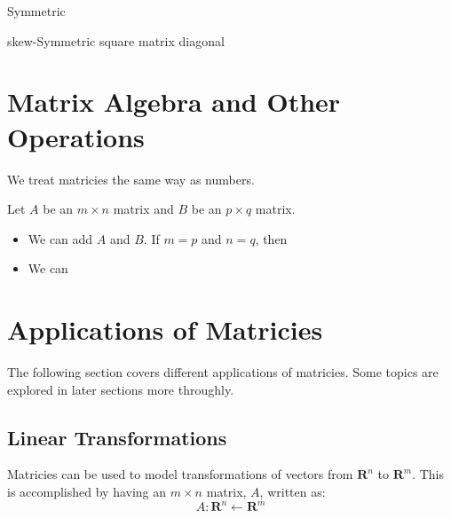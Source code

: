\documentclass[../main.tex]{subfiles}
\begin{document}
Symmetric

skew-Symmetric
square matrix
diagonal


\section{Matrix Algebra and Other Operations}

We treat matricies the same way as numbers.

Let \( A \) be an \( m \times n \) matrix and \( B\) be an \( p \times q \) matrix.
\begin{itemize}[mode=unboxed]
    \item We can add \( A \) and \( B \). If \( m=p \) and \( n=q \), then

    \item We can 
\end{itemize}



\section{Applications of Matricies}

The following section covers different applications of matricies. Some topics are explored in later sections more throughly.

\subsection{Linear Transformations}
Matricies can be used to model transformations of vectors from \( \mathbf{R}^n \) to \( \mathbf{R}^m \).
This is accomplished by having an \( m \times n \) matrix, \( A \), written as: \[ A: \mathbf{R}^n \leftarrow \mathbf{R}^m \]
\end{document}

